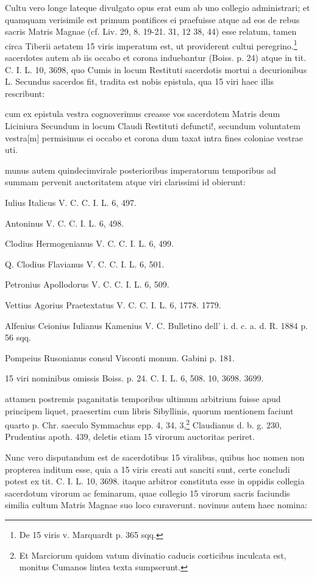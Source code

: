 \documentclass[a4paper, 11pt, oneside, polutonikogreek, german, twocolumn]{article}
\begin{document}
Cultu vero longe lateque divulgato opus erat eum ab uno collegio administrari; et quamquam verisimile est primum pontifices ei praefuisse atque ad eos de rebus sacris Matris Magnae (cf. Liv. 29, 8. 19-21. 31, 12 38, 44) esse relatum, tamen circa Tiberii aetatem 15 viris imperatum est, ut providerent cultui peregrino.\footnote{De 15 viris v. Marquardt p. 365 sqq.} sacerdotes autem ab iis occabo et corona induebantur (Boiss. p. 24) atque in tit. C. I. L. 10, 3698, quo Cumis in locum Restituti sacerdotis mortui a decurionibus L. Secundus sacerdos fit, tradita est nobis epistula, qua 15 viri haec illis rescribunt:

cum ex epistula vestra cognoverimus creasse vos sacerdotem Matris deum Liciniura Secundum in locum Claudi Restituti defuncti!, secundum voluntatem vestra[m] permisimus ei occabo et corona dum taxat intra fines coloniae vestrae uti.

munus autem quindecimvirale posterioribus imperatorum temporibus ad summam pervenit auctoritatem atque viri clarissimi id obierunt:

Iulius Italicus V. C. C. I. L. 6, 497.

Antoninus V. C. C. I. L. 6, 498.

Clodius Hermogenianus V. C. C. I. L. 6, 499.

Q. Clodius Flavianus V. C. C. I. L. 6, 501.

Petronius Apollodorus V. C. C. I. L. 6, 509.

Vettius Agorius Praetextatus V. C. C. I. L. 6, 1778. 1779.

Alfenius Ceionius Iulianus Kamenius V. C. Bulletino dell' i. d. c. a. d. R. 1884 p. 56 sqq.

Pompeius Rusonianus consul Visconti monum. Gabini p. 181.

15 viri nominibus omissis Boiss. p. 24. C. I. L. 6, 508. 10, 3698. 3699.

attamen postremis paganitatis temporibus ultimum arbitrium fuisse apud principem liquet, praesertim cum libris Sibyllinis, quorum mentionem faciunt quarto p. Chr. saeculo Symmachus epp. 4, 34, 3,\footnote{Et Marciorum quidom vatum divinatio caducis corticibus inculcata est, monitus Cumanos lintea texta sumpserunt.} Claudianus d. b. g. 230, Prudentius apoth. 439, deletis etiam 15 virorum auctoritas periret.

Nunc vero disputandum est de sacerdotibus 15 viralibus, quibus hoc nomen non propterea inditum esse, quia a 15 viris creati aut sanciti sunt, certe concludi potest ex tit. C. I. L. 10, 3698. itaque arbitror constituta esse in oppidis collegia sacerdotum virorum ac feminarum, quae collegio 15 virorum sacris faciundis similia cultum Matris Magnae suo loco curaverunt. novimus autem haec nomina:
\end{document}
